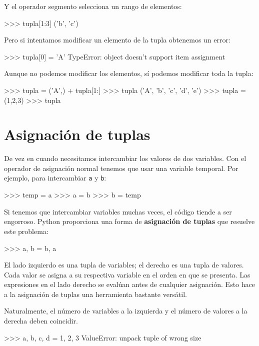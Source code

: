 Y el operador segmento selecciona un rango de elementos:
\begin{pyconcode}
>>> tupla[1:3]
('b', 'c')
\end{pyconcode}

Pero si intentamos modificar un elemento de la tupla obtenemos un
error:

\begin{pyconcode}
>>> tupla[0] = 'A'
TypeError: object doesn't support item assignment
\end{pyconcode}

Aunque no podemos modificar los elementos, sí podemos modificar toda
la tupla:
\begin{pyconcode}
>>> tupla = ('A',) + tupla[1:]
>>> tupla
('A', 'b', 'c', 'd', 'e')
>>> tupla = (1,2,3)
>>> tupla
\end{pyconcode}

\section{Asignación de tuplas}

\label{tuple assignment}  

De vez en cuando necesitamos intercambiar los valores de dos variables.
Con el operador de asignación normal tenemos que usar una variable
temporal. Por ejemplo, para intercambiar \texttt{a} y \texttt{b}:
\begin{pyconcode}
>>> temp = a
>>> a = b
>>> b = temp
\end{pyconcode}

Si tenemos que intercambiar variables muchas veces, el código tiende
a ser engorroso. Python proporciona una forma de \textbf{asignación
de tuplas} que resuelve este problema:
\begin{pyconcode}
>>> a, b = b, a
\end{pyconcode}

El lado izquierdo es una tupla de variables; el derecho es una tupla
de valores. Cada valor se asigna a su respectiva variable en el orden
en que se presenta. Las expresiones en el lado derecho se evalúan
antes de cualquier asignación. Esto hace a la asignación de tuplas
una herramienta bastante versátil.

Naturalmente, el número de variables a la izquierda y el número de
valores a la derecha deben coincidir.
\begin{pyconcode}
>>> a, b, c, d = 1, 2, 3
ValueError: unpack tuple of wrong size
\end{pyconcode}

